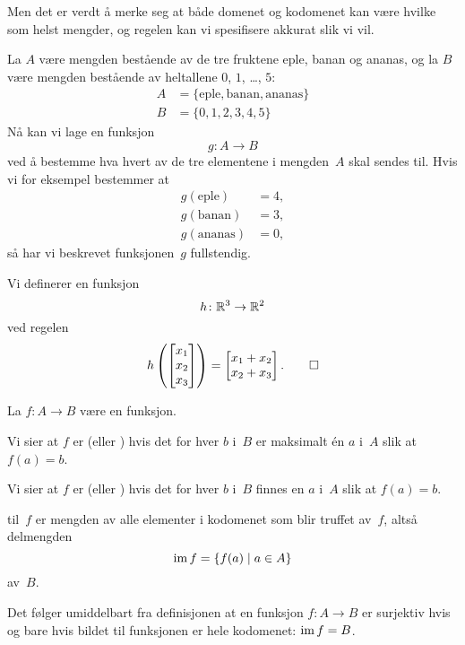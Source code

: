 Men det er verdt å merke seg at både domenet og kodomenet kan være
hvilke som helst mengder, og regelen kan vi spesifisere akkurat slik
vi vil.

\begin{ex}
\label{ex:funksjon2}
La $A$ være mengden bestående av de tre fruktene eple, banan og
ananas, og la $B$ være mengden bestående av heltallene $0$, $1$,
\ldots, $5$:
\begin{align*}
A &= \{ \text{eple}, \text{banan}, \text{ananas} \} \\
B &= \{ 0, 1, 2, 3, 4, 5 \}
\end{align*}
Nå kan vi lage en funksjon
\[
g \colon A \to B
\]
ved å bestemme hva hvert av de tre elementene i mengden~$A$ skal
sendes til.  Hvis vi for eksempel bestemmer at
\begin{align*}
g(\text{eple}) &= 4, \\
g(\text{banan}) &= 3, \\
g(\text{ananas}) &= 0,
\end{align*}
så har vi beskrevet funksjonen~$g$ fullstendig.
\end{ex}

\begin{ex}
\label{ex:funksjon3}
Vi definerer en funksjon
\[
h \colon \mathbb{R}^3 \to \mathbb{R}^2
\]
ved regelen
\[
h\left( \begin{bmatrix} x_1 \\ x_2 \\ x_3 \end{bmatrix} \right)
= \begin{bmatrix} x_1 + x_2 \\ x_2 + x_3 \end{bmatrix}.
\qedhere
\]
\end{ex}


\begin{defn}
La $f \colon A \to B$ være en funksjon.

Vi sier at $f$ er  (eller ) hvis
det for hver $b$ i~$B$ er maksimalt én $a$ i~$A$ slik at $f(a) = b$.

Vi sier at $f$ er  (eller ) hvis
det for hver $b$ i~$B$ finnes en $a$ i~$A$ slik at $f(a) = b$.

 til~$f$ er mengden av alle elementer i kodomenet som
blir truffet av~$f$, altså delmengden
\[
\operatorname{im} f = \{ f(a) \mid a \in A \}
\]
av~$B$.
\end{defn}

Det følger umiddelbart fra definisjonen at en funksjon
$f \colon A \to B$ er surjektiv hvis og bare hvis bildet til
funksjonen er hele kodomenet: $\operatorname{im} f = B$.

